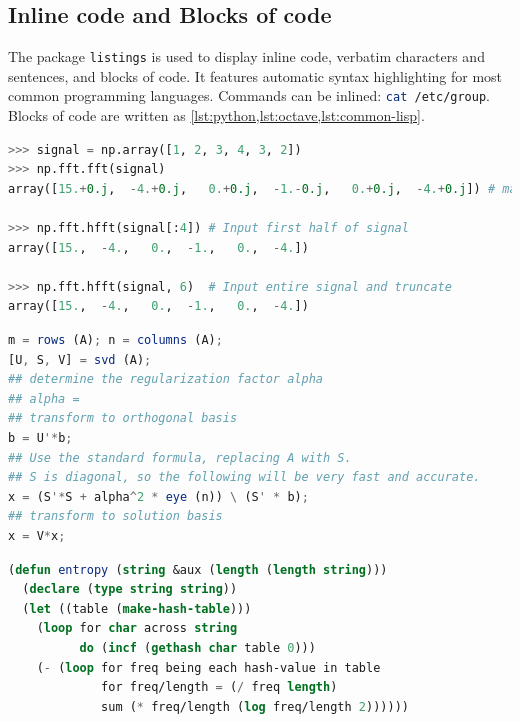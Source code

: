 \subsection{Inline code and Blocks of code}
The package \lstinline{listings} \cite{listings} is used to display inline
code, verbatim characters and sentences, and blocks of code. It features
automatic syntax highlighting for most common programming languages.  Commands
can be inlined: \lstinline[style=mystyle,language=sh]{cat /etc/group}.  Blocks
of code are written as \cref{lst:python,lst:octave,lst:common-lisp}.

\begin{lstlisting}[language=Python,
                   caption={Python code sample \cite{numpy-hfft}.},
                   label={lst:python}]
>>> signal = np.array([1, 2, 3, 4, 3, 2])
>>> np.fft.fft(signal)
array([15.+0.j,  -4.+0.j,   0.+0.j,  -1.-0.j,   0.+0.j,  -4.+0.j]) # may vary

>>> np.fft.hfft(signal[:4]) # Input first half of signal
array([15.,  -4.,   0.,  -1.,   0.,  -4.])

>>> np.fft.hfft(signal, 6)  # Input entire signal and truncate
array([15.,  -4.,   0.,  -1.,   0.,  -4.])
\end{lstlisting}

\begin{lstlisting}[language=Octave,
                   caption={Octave code sample \cite{octave-example}.},
                   label={lst:octave}]
m = rows (A); n = columns (A);
[U, S, V] = svd (A);
## determine the regularization factor alpha
## alpha =
## transform to orthogonal basis
b = U'*b;
## Use the standard formula, replacing A with S.
## S is diagonal, so the following will be very fast and accurate.
x = (S'*S + alpha^2 * eye (n)) \ (S' * b);
## transform to solution basis
x = V*x;
\end{lstlisting}

\begin{lstlisting}[language=Lisp,
                   caption={Common Lisp code sample
                            \cite{common-lisp-example}.},
                   label={lst:common-lisp}]
(defun entropy (string &aux (length (length string)))
  (declare (type string string))
  (let ((table (make-hash-table)))
    (loop for char across string
          do (incf (gethash char table 0)))
    (- (loop for freq being each hash-value in table
             for freq/length = (/ freq length)
             sum (* freq/length (log freq/length 2))))))
\end{lstlisting}

